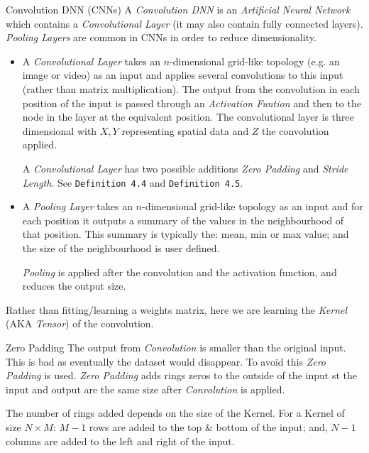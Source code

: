 \documentclass[11pt,a4paper]{article}
\begin{document}
  \begin{definition}{Convolution DNN (CNNs)}
    A \textit{Convolution DNN} is an \textit{Artificial Neural Network} which contains a \textit{Convolutional Layer} (it may also contain fully connected layers). \textit{Pooling Layers} are common in CNNs in order to reduce dimensionality.

    \begin{itemize}
      \item A \textit{Convolutional Layer} takes an $n$-dimensional grid-like topology (e.g. an image or video) as an input and applies several convolutions to this input (rather than matrix multiplication). The output from the convolution in each position of the input is passed through an \textit{Activation Funtion} and then to the node in the layer at the equivalent position. The convolutional layer is three dimensional with $X,Y$ representing spatial data and $Z$ the convolution applied.
      \par A \textit{Convolutional Layer} has two possible additions \textit{Zero Padding} and \textit{Stride Length}. See \texttt{Definition 4.4} and \texttt{Definition 4.5}.
      \item A \textit{Pooling Layer} takes an $n$-dimensional grid-like topology as an input and for each position it outputs a summary of the values in the neighbourhood of that position. This summary is typically the: mean, min or max value; and the size of the neighbourhood is user defined.
      \par \textit{Pooling} is applied after the convolution and the activation function, and reduces the output size.
    \end{itemize}
    Rather than fitting/learning a weights matrix, here we are learning the \textit{Kernel} (AKA \textit{Tensor}) of the convolution.
  \end{definition}

  \begin{definition}{Zero Padding}
    The output from \textit{Convolution} is smaller than the original input. This is bad as eventually the dataset would disappear. To avoid this \textit{Zero Padding} is used. \textit{Zero Padding} adds rings zeros to the outside of the input st the input and output are the same size after \textit{Convolution} is applied.
    \par The number of rings added depends on the size of the Kernel. For a Kernel of size $N\times M$: $M-1$ rows are added to the top \& bottom of the input; and, $N-1$ columns are added to the left and right of the input.
  \end{definition}
\end{document}
